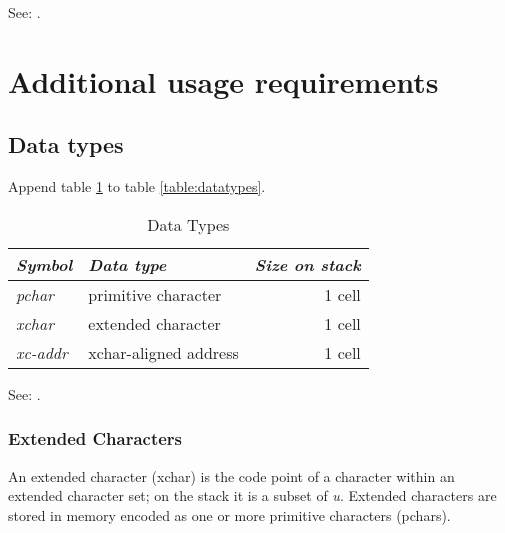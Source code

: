 See: .

\section{Additional usage requirements} %

\subsection{Data types} %

Append table \ref{xchar:types} to table \ref{table:datatypes}.

\begin{table}[ht]
	\begin{center}
		\caption{Data Types}
		\label{xchar:types}
		\begin{tabular}{llr}
			\hline\hline
			\emph{Symbol}		& \emph{Data type} & \emph{Size on stack} \\ \hline
			\emph{pchar}		& primitive character		& 1 cell \\
			\emph{xchar}		& extended character			& 1 cell \\
			\emph{xc-addr}		& xchar-aligned address		& 1 cell \\
			\hline\hline
		\end{tabular}
	\end{center}
\end{table}

See: .

\subsubsection{Extended Characters} %

An extended character (xchar) is the code point of a character within an
extended character set; on the stack it is a subset of \emph{u}.  Extended
characters are stored in memory encoded as one or more primitive characters
(pchars).





